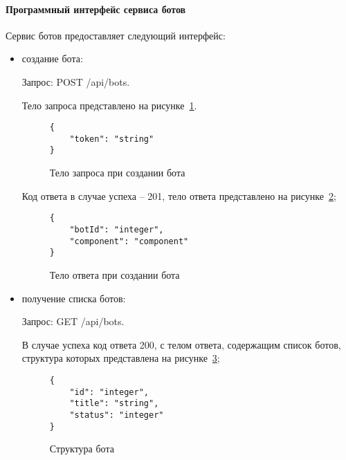 \paragraph{Программный интерфейс сервиса ботов}

Сервис ботов предоставляет следующий интерфейс:
\begin{itemize}
	\item создание бота:

	      Запрос: POST /api/bots.

	      Тело запроса представлено на рисунке~\ref{f:add-bot-request-body}.

	      \begin{figure}[!ht]
		      \centering
		      \vspace{\toppaddingoffigure}
		      \begin{lstlisting}
{
    "token": "string"
}
    \end{lstlisting}
		      \caption{Тело запроса при создании бота}
		      \label{f:add-bot-request-body}
	      \end{figure}

	      Код ответа в случае успеха – 201, тело ответа представлено на
	      рисунке~\ref{f:add-bot-response-body};

	      \begin{figure}[!ht]
		      \centering
		      \vspace{\toppaddingoffigure}
		      \begin{lstlisting}
{
    "botId": "integer",
    "component": "component"
}
    \end{lstlisting}
		      \caption{Тело ответа при создании бота}
		      \label{f:add-bot-response-body}
	      \end{figure}

	\item получение списка ботов:

	      Запрос: GET /api/bots.

	      В случае успеха код ответа 200, с телом ответа, содержащим список
	      ботов, структура которых представлена
	      на рисунке~\ref{f:get-bot-response-body};


	      \begin{figure}[!ht]
		      \centering
		      \vspace{\toppaddingoffigure}
		      \begin{lstlisting}
{
    "id": "integer",
    "title": "string",
    "status": "integer"
}
    \end{lstlisting}
		      \caption{Структура бота}
		      \label{f:get-bot-response-body}
	      \end{figure}


\end{itemize}
